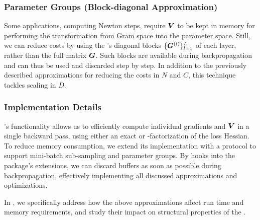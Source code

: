 \subsubsection{Parameter Groups (Block-diagonal Approximation)}

Some applications, \eg computing Newton steps, require ${\bm{V}}$ to be kept in
memory for performing the transformation from Gram space into the parameter
space. Still, we can reduce costs by using the \ggn's diagonal blocks
$\{{\bm{G}}^{(l)}\}_{l=1}^L$ of each layer, rather than the full matrix ${\bm{G}}$. Such
blocks are available during backpropagation and can thus be used and discarded
step by step. In addition to the previously described approximations for
reducing the costs in $N$ and $C$, this technique tackles scaling in $D$.

\subsubsection{Implementation Details}
\backpack's functionality allows us to efficiently compute individual gradients
and ${\bm{V}}$ in a single backward pass, using either an exact or \mc-factorization
of the loss Hessian. To reduce memory consumption, we extend its implementation
with a protocol to support mini-batch sub-sampling and parameter groups. By
hooks into the package's extensions, we can discard buffers as soon as possible
during backpropagation, effectively implementing all discussed approximations
and optimizations.

In , we specifically address how the above approximations
affect run time and memory requirements, and study their impact on structural
properties of the \ggn.

